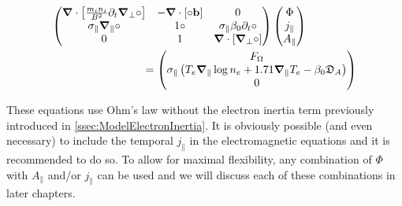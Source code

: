 \begin{align}
	\makebox[0.8\textwidth][l]{$\displaystyle
		\begin{pmatrix}
			\grad\cdot\left[\frac{m_i n_i}{ B^2}\partial_t\grad_\perp\circ\right] & 
			- \grad\cdot\left[\circ\mathbf{b}\right] & 
			0 \\
			\sigma_\parallel\grad_\parallel\circ &
			1 \circ &
			\sigma_\parallel\beta_0\partial_t\circ \\
			0 & 1 & \grad\cdot\left[\grad_\perp\circ\right]
		\end{pmatrix}
		\begin{pmatrix}
			\Phi \\ j_\parallel \\ A_\parallel
		\end{pmatrix}
		$} \nonumber \\	
	\makebox[0.8\textwidth][r]{$\displaystyle
		=\begin{pmatrix}
			F_\Omega \\
			\sigma_\parallel\left(T_e\grad_\parallel\log n_e + 1.71\grad_\parallel T_e - \beta_0\mathfrak{D}_A \right) \\
			0
		\end{pmatrix}
		$} \label{eq:S3X_vorticityEquation_Electromagnetism_matrix}
\end{align}



These equations use Ohm's law without the electron inertia term previously introduced in \autoref{ssec:ModelElectronInertia}. It is obviously possible (and even necessary) to include the temporal  $j_\parallel$ in the electromagnetic equations and it is recommended to do so. To allow for maximal flexibility, any combination of $\Phi$ with $A_\parallel$ and/or $j_\parallel$ can be used and we will discuss each of these combinations in later chapters.




